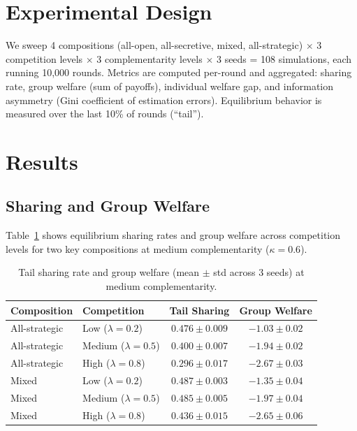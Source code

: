 \documentclass[11pt]{article}
\begin{document}
\section{Experimental Design}

We sweep 4 compositions (all-open, all-secretive, mixed, all-strategic) $\times$ 3 competition levels $\times$ 3 complementarity levels $\times$ 3 seeds = 108 simulations, each running 10,000 rounds.
Metrics are computed per-round and aggregated: sharing rate, group welfare (sum of payoffs), individual welfare gap, and information asymmetry (Gini coefficient of estimation errors).
Equilibrium behavior is measured over the last 10\% of rounds (``tail'').

\section{Results}

\subsection{Sharing and Group Welfare}

Table~\ref{tab:sharing} shows equilibrium sharing rates and group welfare across competition levels for two key compositions at medium complementarity ($\kappa{=}0.6$).

\begin{table}[h]
\centering
\small
\caption{Tail sharing rate and group welfare (mean $\pm$ std across 3 seeds) at medium complementarity.}
\label{tab:sharing}
\begin{tabular}{llcc}
\toprule
\textbf{Composition} & \textbf{Competition} & \textbf{Tail Sharing} & \textbf{Group Welfare} \\
\midrule
All-strategic & Low ($\lambda{=}0.2$) & $0.476 \pm 0.009$ & $-1.03 \pm 0.02$ \\
All-strategic & Medium ($\lambda{=}0.5$) & $0.400 \pm 0.007$ & $-1.94 \pm 0.02$ \\
All-strategic & High ($\lambda{=}0.8$) & $0.296 \pm 0.017$ & $-2.67 \pm 0.03$ \\
\midrule
Mixed & Low ($\lambda{=}0.2$) & $0.487 \pm 0.003$ & $-1.35 \pm 0.04$ \\
Mixed & Medium ($\lambda{=}0.5$) & $0.485 \pm 0.005$ & $-1.97 \pm 0.04$ \\
Mixed & High ($\lambda{=}0.8$) & $0.436 \pm 0.015$ & $-2.65 \pm 0.06$ \\
\bottomrule
\end{tabular}
\end{table}
\end{document}
